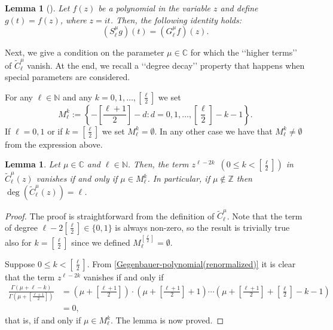 \documentclass[12pt, pdflatex, a4paper]{article}
\theoremstyle{plain}
\newtheorem{lemma}[thm]{Lemma}
\theoremstyle{definition}
\def\C{{\mathbb C}}
\def\Geg{\widetilde{C}}
\def\N{{\mathbb N}}
\def\Z{{\mathbb Z}}
\begin{document}
\begin{lemma}[{\cite[Lem. 14.2]{KKP16}}]\label{lemma-relationS-G} Let $f(z)$ be a polynomial in the variable $z$ and define $g(t) = f(z)$, where $z = it$. Then, the following identity holds:
\begin{equation*}
\left(S_\ell^\mu g\right)(t) = \left(G_\ell^\mu f\right)(z).
\end{equation*}
\end{lemma}

Next, we give a condition on the parameter $\mu \in \C$ for which the \lq\lq higher terms\rq\rq{ }of $\Geg_\ell^\mu$ vanish. At the end, we recall a \lq\lq degree decay\rq\rq{ }property that happens when special parameters are considered.

For any $\ell \in \N$ and any $k = 0, 1, \ldots, \left[\frac{\ell}{2}\right]$ we set
\begin{equation}\label{def-Mlk-set}
M_\ell^k := \left\{-\left[\frac{\ell+1}{2}\right]-d : d= 0, 1, \ldots, \left[\frac{\ell}{2}\right]-k-1\right\}.
\end{equation}
If $\ell = 0, 1$ or if $k = \left[\frac{\ell}{2}\right]$ we set $M_\ell^k = \emptyset$. In any other case we have that $M_\ell^k \neq \emptyset$ from the expression above.

\begin{lemma}\label{lemma-Gegenbauer-Mlk-condition}
Let $\mu \in \C$ and $\ell \in \N$. Then, the term $z^{\ell-2k} \enspace (0 \leq k < \left[\frac{\ell}{2}\right])$ in $\Geg_\ell^\mu(z)$ vanishes if and only if $\mu \in M_\ell^k$. In particular, if $\mu \notin \Z$ then $\deg(\Geg_\ell^\mu(z)) = \ell$.
\end{lemma}
\begin{proof}
The proof is straightforward from the definition of $\Geg_\ell^\mu$. Note that the term of degree $\ell -2\left[\frac{\ell}{2}\right] \in \{0, 1\}$ is always non-zero, so the result is trivially true also for $k = \left[\frac{\ell}{2}\right]$ since we defined $M_\ell^{\left[\frac{\ell}{2}\right]} = \emptyset$.

Suppose $0 \leq k < \left[\frac{\ell}{2}\right]$. From \eqref{Gegenbauer-polynomial(renormalized)} it is clear that the term $z^{\ell-2k}$ vanishes if and only if
\begin{equation*}
\begin{aligned}
\frac{\Gamma\left(\mu + \ell -k \right)}{\Gamma\left(\mu + \left[\frac{\ell+1}{2}\right]\right)} &= \left(\mu + \left[\frac{\ell+1}{2}\right]\right) \cdot \left(\mu + \left[\frac{\ell+1}{2}\right] + 1\right) \cdots \left(\mu + \left[\frac{\ell+1}{2}\right] + \left[\frac{\ell}{2}\right] -k -1\right)\\
&= 0,
\end{aligned}
\end{equation*}
that is, if and only if $\mu \in M_\ell^k$. The lemma is now proved.
\end{proof} 
\end{document}
